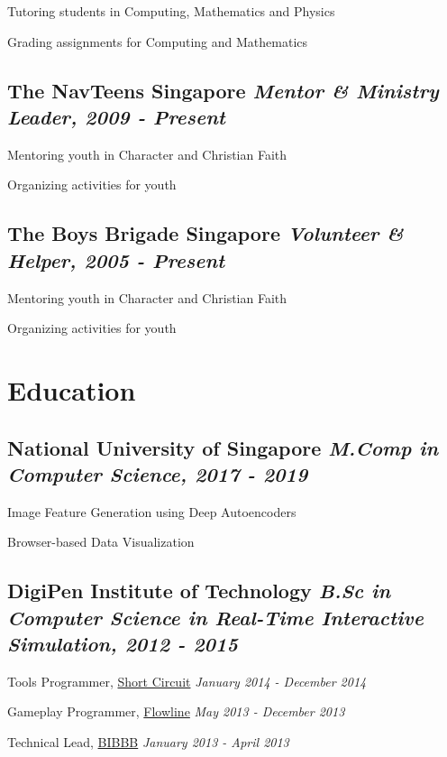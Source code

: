 \documentclass[letterpaper,11pt]{article}
\newcommand{\cvitem}[1]{\hspace{10pt}\vspace{2.5pt} \small\scshape\raggedright \textcolor{item_color}{#1}\\}
\newcommand{\link}[2]{\textcolor{link_color}{\href{#1}{#2}}}
\newcommand{\qualifier}[1]{\hfill \textsl{\footnotesize #1}}
\begin{document}
    \cvitem{Tutoring students in Computing, Mathematics and Physics}
    \cvitem{Grading assignments for Computing and Mathematics}

\subsection{The NavTeens Singapore \qualifier{Mentor \& Ministry Leader, 2009 - Present}}

    \cvitem{Mentoring youth in Character and Christian Faith}
    \cvitem{Organizing activities for youth}

\subsection{The Boys Brigade Singapore \qualifier{Volunteer \& Helper, 2005 - Present}}

    \cvitem{Mentoring youth in Character and Christian Faith}
    \cvitem{Organizing activities for youth}

\section{Education}

\subsection{National University of Singapore \qualifier{M.Comp in Computer Science, 2017 - 2019}}

    \cvitem{Image Feature Generation using Deep Autoencoders}
    \cvitem{Browser-based Data Visualization}

\subsection{DigiPen Institute of Technology \qualifier{B.Sc in Computer Science in Real-Time Interactive Simulation, 2012 - 2015}}

    \cvitem{Tools Programmer, \link{http://games.digipen.edu/games/shortcircuit}{Short Circuit} \qualifier{January 2014 - December 2014}}
    \cvitem{Gameplay Programmer, \link{http://games.digipen.edu/games/flowline}{Flowline} \qualifier{May 2013 - December 2013}}
    \cvitem{Technical Lead, \link{http://games.digipen.edu/games/bibbb}{BIBBB} \qualifier{January 2013 - April 2013}}
\end{document}
